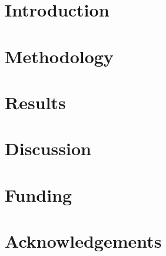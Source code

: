 
\section{Introduction}\label{intro}


\section{Methodology}\label{method}


\section{Results}\label{results}


\section{Discussion}\label{discuss}


\section*{Funding}


\section*{Acknowledgements}






